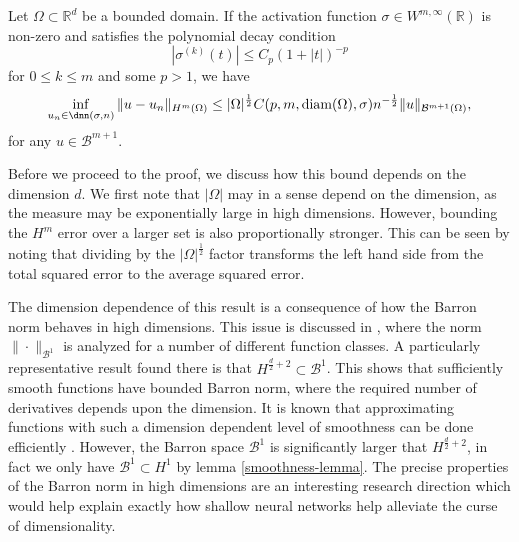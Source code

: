 \begin{theorem}\label{approximation_rate_theorem}
 Let $\Omega\subset \mathbb{R}^d$ be a bounded domain. If the activation function $\sigma\in W^{m,\infty}(\mathbb{R})$ is non-zero and satisfies the polynomial decay condition 
 \begin{equation}\label{growth_condition}
  |\sigma^{(k)}(t)| \leq C_p(1 + |t|)^{-p}
 \end{equation}
 for $0\leq k\leq m$ and some $p > 1$, we have
 \begin{equation}
  \inf_{u_n\in \dnn(\sigma,n)}\|u-u_n\|_{H^m(\Omega)} \leq |\Omega|^{\frac{1}{2}}C(p,m,\text{\normalfont diam}(\Omega),\sigma)n^{-\frac{1}{2}}\|u\|_{\mathcal{B}^{m+1}(\Omega)},
 \end{equation}
 for any $u\in \mathcal{B}^{m+1}$.
\end{theorem}
Before we proceed to the proof, we discuss how this bound depends on
the dimension $d$. We first note that $|\Omega|$ may in a sense depend
on the dimension, as the measure may be exponentially large in high
dimensions. However, bounding the $H^m$ error over a larger set is
also proportionally stronger. This can be seen by noting that dividing
by the $|\Omega|^\frac{1}{2}$ factor transforms the left hand side
from the total squared error to the average squared error.

The dimension dependence of this result is a consequence of how the
Barron norm behaves in high dimensions. This issue is discussed in
\cite{barron1993universal}, where the norm $\|\cdot\|_{\mathcal{B}^1}$
is analyzed for a number of different function classes. A particularly
representative result found there is that $H^{\frac{d}{2}+2}\subset
\mathcal{B}^1$. This shows that sufficiently smooth functions have
bounded Barron norm, where the required number of derivatives depends
upon the dimension. It is known that approximating functions with such
a dimension dependent level of smoothness can be done efficiently
\cite{petrushev1998approximation, kainen2007sobolev}. However, the
Barron space $\mathcal{B}^1$ is significantly larger that
$H^{\frac{d}{2}+2}$, in fact we only have $\mathcal{B}^1 \subset H^1$
by lemma \ref{smoothness-lemma}. The precise properties of the Barron
norm in high dimensions are an interesting research direction which
would help explain exactly how shallow neural networks help alleviate
the curse of dimensionality.


